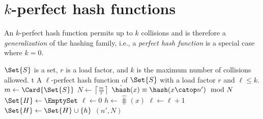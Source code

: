 \documentclass[ ../main.tex]{subfiles}
\begin{document}
\section{$k$-perfect hash functions}
An $k$-perfect hash function permits up to $k$ collisions and is therefore a \emph{generalization} of the hashing family, i.e., a \emph{perfect hash function} is a special case where $k=0$.

\begin{algorithm}
	\caption{$k$-perfect hash function generator}
	\label{alg:kph}
	\KwIn
	{
		$\Set{S}$ is a set, $r$ is a load factor, and $k$ is the maximum number of collisions allowed.
	}
	\KwOut
	{t
		A $\ell$-perfect hash function of $\Set{S}$ with a load factor $r$ and $\ell \leq k$.
	}
	{
		$m \gets \Card{\Set{S}}$\;
		$N \gets \left\lceil \frac{m}{r} \right\rceil$\;
		{
			$\hat{\hash}(x) \equiv \hash(x \catop n') \mod N$\;
			$\Set{H} \gets \EmptySet$\;
			$\ell \gets 0$\;
			{
				$h \gets \hat{\hash}(x)$\;
				{
					$\ell \gets \ell + 1$\;
				}
				$\Set{H} \gets \Set{H} \cup \{ h \}$\;
			}
			{
				\Return $(n',N)$\;
			}                
		}        
	}
\end{algorithm}
\end{document}
